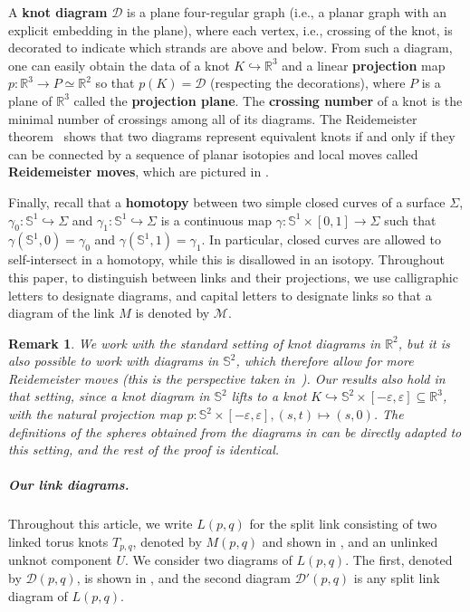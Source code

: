 \documentclass[10pt,a4paper]{amsart}
\newcommand{\Sp}{\mathbb{S}}
\newtheorem{remark}[theorem]{Remark}
\begin{document}
A \textbf{knot diagram} $\mathcal{D}$ is a plane four-regular graph (i.e., a planar graph with an explicit embedding in the plane), where each vertex, i.e., crossing of the knot, is decorated to indicate which strands are above and below. From such a diagram, one can easily obtain the data of a knot $K \hookrightarrow \mathbb{R}^3$ and a linear \textbf{projection} map $p: \mathbb{R}^3 \rightarrow P \simeq \mathbb{R}^2$ so that $p(K)=\mathcal{D}$ (respecting the decorations), where $P$ is a plane of $\mathbb{R}^3$ called the \textbf{projection plane}. The \textbf{crossing number} of a knot is the minimal number of crossings among all of its diagrams. The Reidemeister theorem~\cite{Reidemeister_reidemeister_th} shows that two diagrams represent equivalent knots if and only if they can be connected by a sequence of planar isotopies and local moves called \textbf{Reidemeister moves}, which are pictured in . 

Finally, recall that a \textbf{homotopy} between two simple closed curves of a surface $\Sigma$, $\gamma_0:\mathbb{S}^1 \hookrightarrow \Sigma$ and $\gamma_1:\mathbb{S}^1 \hookrightarrow \Sigma$ is a continuous map $\gamma:\mathbb{S}^1 \times [0,1] \rightarrow \Sigma$ such that $\gamma (\mathbb{S}^1,0)=\gamma_0$ and $\gamma (\mathbb{S}^1,1)=\gamma_1$. In particular, closed curves are allowed to self-intersect in a homotopy, while this is disallowed in an isotopy. Throughout this paper, to distinguish between links and their projections, we use calligraphic letters to designate diagrams, and capital letters to designate links so that a diagram of the link $M$ is denoted by $\mathcal{M}$.

\begin{remark}
We work with the standard setting of knot diagrams in $\mathbb{R}^2$, but it is also possible to work with diagrams in $\Sp^2$, which therefore allow for more Reidemeister moves (this is the perspective taken in~\cite{Mesmay_hard_unknot}). Our results also hold in that setting, since a knot diagram in $\Sp^2$ lifts to a knot $K \hookrightarrow \Sp^2 \times [-\varepsilon,\varepsilon] \subseteq \mathbb{R}^3$, with the natural projection map $p:\Sp^2 \times [-\varepsilon,\varepsilon], (s,t) \mapsto (s,0)$. The definitions of the spheres obtained from the diagrams in  can be directly adapted to this setting, and the rest of the proof is identical.
\end{remark}

\subparagraph*{Our link diagrams.} Throughout this article, we write $L(p,q)$ for the split link consisting of two linked torus knots $T_{p,q}$, denoted by $M(p,q)$ and shown in , and an unlinked unknot component $U$. We consider two diagrams of $L(p,q)$. The first, denoted by $\mathcal{D}(p,q)$, is shown in , and the second diagram $\mathcal{D}'(p,q)$ is any split link diagram of $L(p,q)$.
\end{document}
